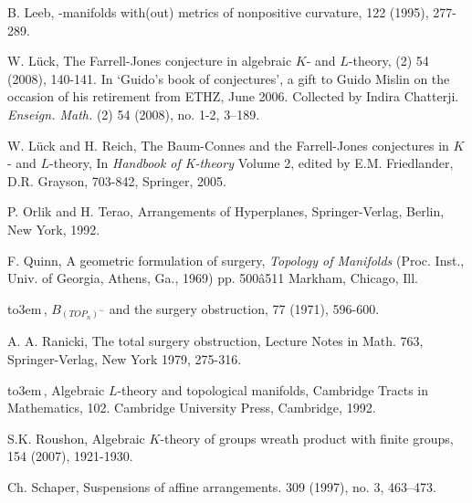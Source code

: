 \documentclass[12pt]{amsart}
\numberwithin{equation}{section}
\begin{document}
\begin{thebibliography}{60}
B. Leeb, 
-manifolds with(out) metrics of nonpositive curvature,
 122 (1995), 277-289.

W. L\"{u}ck,
\newblock The Farrell-Jones conjecture in algebraic $K$- and $L$-theory,
 (2) 54 (2008), 140-141. In `Guido's book of conjectures',
a gift to Guido Mislin on the occasion of his retirement from ETHZ, June 2006. Collected by Indira Chatterji.
{\em Enseign. Math.} (2) 54 (2008), no. 1-2, 3--189.

W. L\"{u}ck and H. Reich, 
\newblock The Baum-Connes and the Farrell-Jones conjectures in $K$- and
$L$-theory, 
\newblock  In {\em Handbook of K-theory} Volume 2, edited by E.M. Friedlander, D.R.
Grayson, 703-842, Springer, 2005.

P. Orlik and H. Terao,
\newblock Arrangements of Hyperplanes,
\newblock Springer-Verlag, Berlin, New York, 1992.

F. Quinn,
\newblock A geometric formulation of surgery, 
 {\em Topology of Manifolds} (Proc. Inst., Univ. of Georgia, 
Athens, Ga., 1969) pp. 500â511 Markham, Chicago, Ill.

{\leavevmode\hbox to3em{\hrulefill}\,}, 
\newblock $B_{(TOP_n)^{\sim}}$ and the surgery obstruction,
 77 (1971), 596-600.

A. A. Ranicki,
\newblock The total surgery obstruction,
\newblock Lecture Notes in Math. 763, Springer-Verlag, New York 1979, 275-316.

{\leavevmode\hbox to3em{\hrulefill}\,},
\newblock Algebraic $L$-theory and topological manifolds, 
\newblock Cambridge Tracts in Mathematics, 102. Cambridge 
University Press, Cambridge, 1992.

S.K. Roushon,
\newblock Algebraic $K$-theory of groups wreath product 
with finite groups, 
 154 (2007), 1921-1930.

Ch. Schaper,
\newblock Suspensions of affine arrangements.
 309 (1997), no. 3, 463--473.

\end{thebibliography}

\medskip
\end{document}
